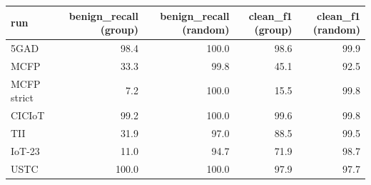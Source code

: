 \begin{tabular}{lrrrr}
\toprule
run & benign\_recall (group) & benign\_recall (random) & clean\_f1 (group) & clean\_f1 (random) \\
\midrule
5GAD & 98.4 & 100.0 & 98.6 & 99.9 \\
MCFP & 33.3 & 99.8 & 45.1 & 92.5 \\
MCFP strict & 7.2 & 100.0 & 15.5 & 99.8 \\
CICIoT & 99.2 & 100.0 & 99.6 & 99.8 \\
TII & 31.9 & 97.0 & 88.5 & 99.5 \\
IoT-23 & 11.0 & 94.7 & 71.9 & 98.7 \\
USTC & 100.0 & 100.0 & 97.9 & 97.7 \\
\bottomrule
\end{tabular}
